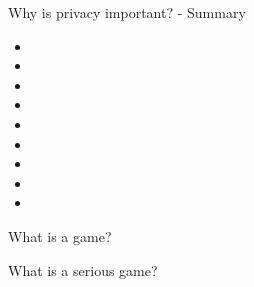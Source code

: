 \documentclass{beamer}
\begin{document}
\begin{frame}{Why is privacy important? - Summary}
\begin{itemize}
  \item
  \item
  \item
  \item
  \item
  \item
  \item
  \item
  \item
\end{itemize}
\end{frame}


\begin{frame}{What is a game?}

\end{frame}


\begin{frame}{What is a serious game?}

\end{frame}
\end{document}
